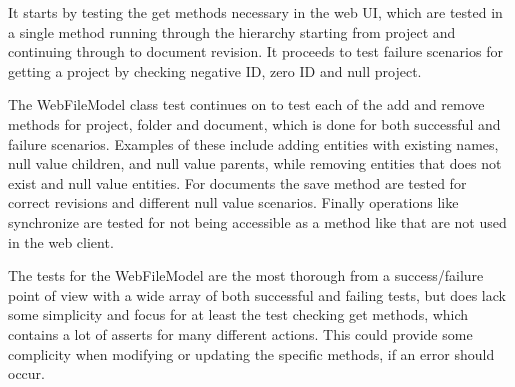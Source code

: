 It starts by testing the get methods necessary in the web UI, which are tested in a single method running through the hierarchy starting from project and continuing through to document revision. It proceeds to test failure scenarios for getting a project by checking negative ID, zero ID and null project.

The WebFileModel class test continues on to test each of the add and remove methods for project, folder and document, which is done for both successful and failure scenarios. Examples of these include adding entities with existing names, null value children, and null value parents, while removing entities that does not exist and null value entities. For documents the save method are tested for correct revisions and different null value scenarios. Finally operations like synchronize are tested for not being accessible as a method like that are not used in the web client.

The tests for the WebFileModel are the most thorough from a success/failure point of view with a wide array of both successful and failing tests, but does lack some simplicity and focus for at least the test checking get methods, which contains a lot of asserts for many different actions. This could provide some complicity when modifying or updating the specific methods, if an error should occur.